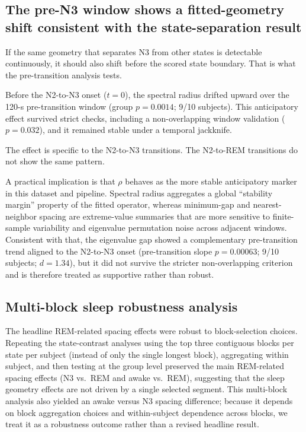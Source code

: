 \documentclass[preprint,12pt,nonatbib]{elsarticle}
\begin{document}
\subsection{The pre-N3 window shows a fitted-geometry shift consistent with the state-separation result}
If the same geometry that separates N3 from other states is detectable continuously, it should also shift before the scored state boundary. That is what the pre-transition analysis tests.

Before the N2-to-N3 onset ($t=0$), the spectral radius drifted upward over the 120-s pre-transition window (group $p=0.0014$; 9/10 subjects). This anticipatory effect survived strict checks, including a non-overlapping window validation ($p=0.032$), and it remained stable under a temporal jackknife.

The effect is specific to the N2-to-N3 transitions. The N2-to-REM transitions do not show the same pattern.

A practical implication is that $\rho$ behaves as the more stable anticipatory marker in this dataset and pipeline. Spectral radius aggregates a global ``stability margin'' property of the fitted operator, whereas minimum-gap and nearest-neighbor spacing are extreme-value summaries that are more sensitive to finite-sample variability and eigenvalue permutation noise across adjacent windows. Consistent with that, the eigenvalue gap showed a complementary pre-transition trend aligned to the N2-to-N3 onset (pre-transition slope $p=0.00063$; 9/10 subjects; $d=1.34$), but it did not survive the stricter non-overlapping criterion and is therefore treated as supportive rather than robust.

\subsection{Multi-block sleep robustness analysis}\label{sec:multiblock_sleep}
The headline REM-related spacing effects were robust to block-selection choices. Repeating the state-contrast analyses using the top three contiguous blocks per state per subject (instead of only the single longest block), aggregating within subject, and then testing at the group level preserved the main REM-related spacing effects (N3 vs.~REM and awake vs.~REM), suggesting that the sleep geometry effects are not driven by a single selected segment. This multi-block analysis also yielded an awake versus N3 spacing difference; because it depends on block aggregation choices and within-subject dependence across blocks, we treat it as a robustness outcome rather than a revised headline result.
\end{document}

